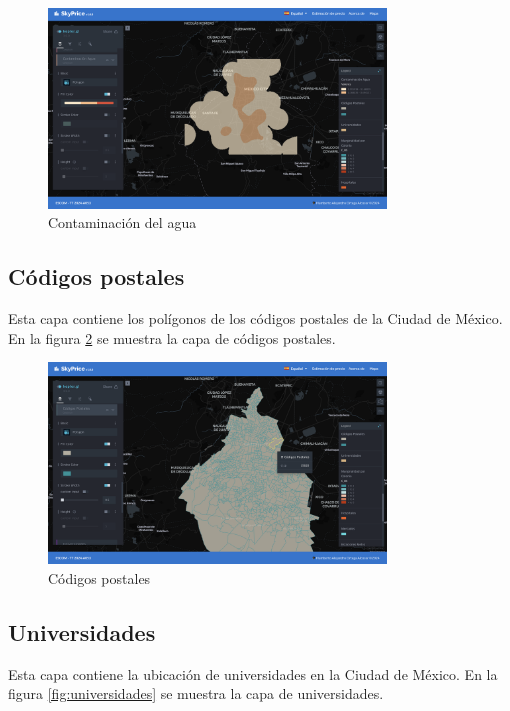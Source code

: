 \begin{figure}[H]
    \centering
    \includegraphics[width=0.8\textwidth]{imagenes/05-mapa-interactivo/contaminacion-agua.png}
    \caption{Contaminación del agua}
    \label{fig:contaminacion-agua}
\end{figure}

\subsection{Códigos postales}
Esta capa contiene los polígonos de los códigos postales de la Ciudad de México. En
la figura \ref{fig:codigos-postales} se muestra la capa de códigos postales.

\begin{figure}[H]
    \centering
    \includegraphics[width=0.8\textwidth]{imagenes/05-mapa-interactivo/codigos-postales.png}
    \caption{Códigos postales}
    \label{fig:codigos-postales}
\end{figure}

\subsection{Universidades}
Esta capa contiene la ubicación de universidades en la Ciudad de México. En la
figura \ref{fig:universidades} se muestra la capa de universidades.

